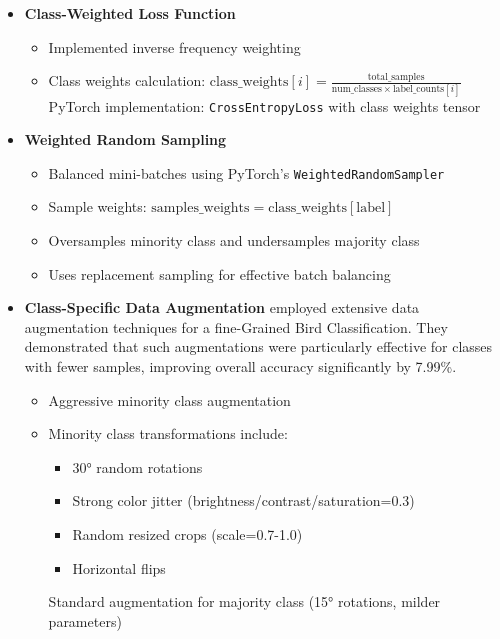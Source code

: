 \documentclass[a4paper,12pt]{report}
\begin{document}
\begin{itemize}
    \item \textbf{Class-Weighted Loss Function}
    \begin{itemize}
        \item Implemented inverse frequency weighting \citep{cui2019classbalanced}
        \item Class weights calculation: \( \text{class\_weights}[i] = \frac{\text{total\_samples}}{\text{num\_classes} \times \text{label\_counts}[i]} \)
        \subitem PyTorch implementation: \texttt{CrossEntropyLoss} with class weights tensor
    \end{itemize}
    
    \item \textbf{Weighted Random Sampling}
    \begin{itemize}
        \item Balanced mini-batches using PyTorch's \texttt{WeightedRandomSampler}
        \item Sample weights: \( \text{samples\_weights} = \text{class\_weights}[\text{label}] \)
        \item Oversamples minority class and undersamples majority class \citep{buda2018systematic}
        \item Uses replacement sampling for effective batch balancing
    \end{itemize}

    \item \textbf{Class-Specific Data Augmentation}
    \citep{chu2020fine} employed extensive data augmentation techniques for a fine-Grained Bird Classification. They demonstrated that such augmentations were particularly effective for classes with fewer samples, improving overall accuracy significantly by 7.99\%.
    \begin{itemize}
        \item Aggressive minority class augmentation \citep{shorten2019survey}
        \item Minority class transformations include:
        \begin{itemize}
            \item 30° random rotations
            \item Strong color jitter (brightness/contrast/saturation=0.3)
            \item Random resized crops (scale=0.7-1.0)
            \item Horizontal flips
        \end{itemize}
        \subitem Standard augmentation for majority class (15° rotations, milder parameters)
    \end{itemize}
\end{itemize}
\end{document}
